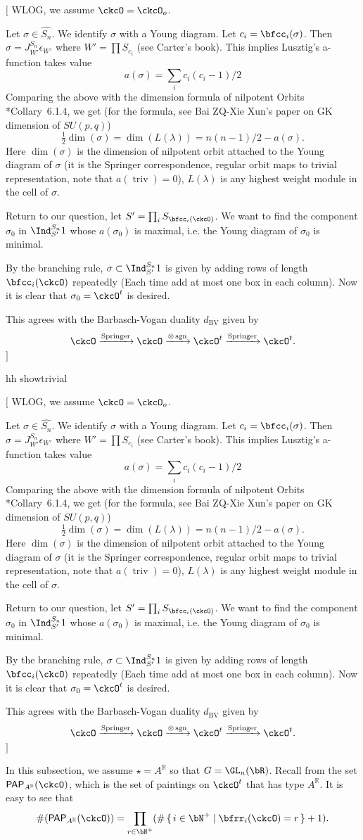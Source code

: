 \documentclass[12pt,a4paper]{amsart}
\newcommand{\trivial}[2][]{\if\relax\detokenize{#1}\relax
  {%
      \color{orange} \vspace{0em} $[$  #2 $]$
      \color{black}
  }
  \else
\ifx#1h
\ifcsname showtrivial\endcsname
{%
    \color{orange} \vspace{0em}  $[$ #2 $]$
    \color{black}
}
\fi
\else {\red Wrong argument!} \fi
\fi
}
\def\Im{\operatorname{Im}}
\def\abs#1{\left|{#1}\right|}
\newcommand{\sgn}{\operatorname{sgn}}
\newcommand{\triv}{\operatorname{triv}}
\newcommand{\R}{\mathbb R}
\numberwithin{equation}{section}
\theoremstyle{remark}
\def\half{{\tfrac{1}{2}}}
\def\dBV{d_{\mathrm{BV}}}
\def\lamck{\lambda_\ckcO}
\def\Wint#1{W_{[#1]}}
\def\PP{\mathsf{PAP}}
\def\Im{\mathrm{Im}}
\def\Spr{\mathrm{Springer}}
\begin{document}
\trivial[h]{ WLOG, we assume $\ckcO = \ckcO_o$.

  Let $\sigma\in \widehat{S_n}$. We identify $\sigma$ with a Young diagram. Let
  $c_i = \bfcc_i(\sigma)$. Then $\sigma = J^{S_n}_{W'} \epsilon_{W'}$ where
  $W' = \prod S_{c_i}$ (see Carter's book). This implies Lusztig's a-function
  takes value
  \[
    a(\sigma) = \sum_i c_i(c_i-1) /2
  \]
  Comparing the above with the dimension formula of nilpotent Orbits
  \cite{CM}*{Collary~6.1.4}, we get (for the formula, see Bai ZQ-Xie Xun's paper
  on GK dimension of $SU(p,q)$)
  \[
    \half \dim(\sigma) = \dim(L(\lambda)) = n(n-1)/2 - a(\sigma).
  \]
  Here $\dim(\sigma)$ is the dimension of nilpotent orbit attached to the Young
  diagram of $\sigma$ (it is the Springer correspondence, regular orbit maps to
  trivial representation, note that $a(\triv)=0$), $L(\lambda)$ is any highest
  weight module in the cell of $\sigma$.


  Return to our question, let $S' = \prod_i S_{\bfcc_i(\ckcO)}$. We want to find
  the component $\sigma_0$ in $\Ind_{S'}^{S_n} 1$ whose $a(\sigma_0)$ is
  maximal, i.e. the Young diagram of $\sigma_0$ is minimal.

  By the branching rule, $\sigma \subset \Ind_{S'}^{S_n} 1$ is given by adding
  rows of length $\bfcc_i(\ckcO)$ repeatedly (Each time add at most one box in
  each column). Now it is clear that $\sigma_0 = \ckcO^t$ is desired.

  This agrees with the Barbasch-Vogan duality $\dBV$ given by
  \[
    \ckcO \xrightarrow{\Spr}\ckcO \xrightarrow{\otimes \sgn} \ckcO^t \xrightarrow{\Spr} \ckcO^t.
  \]
}

In this subsection, we assume  $\star=A^\R$ so that $G = \GL_{n}(\bR)$.
Recall from  the set $\PP_{A^\R}(\ckcO)$, which is the set of paintings on $\ckcO^{t}$ that has type $A^\R$.
It is easy to see that
\begin{equation}\label{eq:PPA.count}
  \#(\PP_{A^\R}(\ckcO)) = \prod_{r\in \bN^{+}} (\#\set{i\in \bN^{+}| \bfrr_{i}(\ckcO)=r}+1).
\end{equation}
\end{document}
